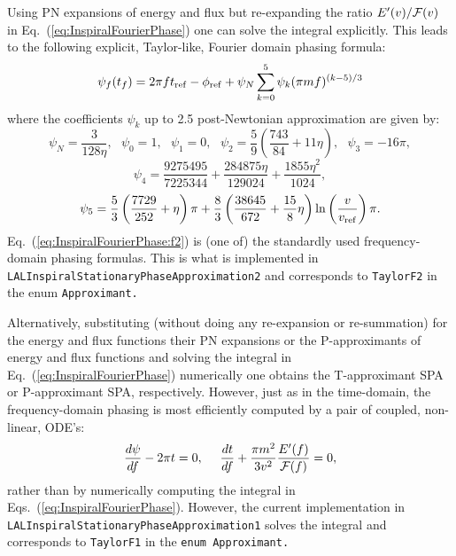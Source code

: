 Using PN expansions of energy and flux but
re-expanding the ratio $E'(v)/{\cal F}(v)$ in Eq.~(\ref{eq:InspiralFourierPhase}) one
can solve the integral explicitly. This leads to the following
explicit, Taylor-like, Fourier domain phasing formula:
\begin{equation}
 \psi_f(t_f) = 2 \pi f t_{\rm ref} - \phi_{\rm ref} + 
 \psi_N \sum_{k=0}^5 {\psi}_k (\pi m f)^{(k-5)/3} 
\label{eq:InspiralFourierPhase:f2}
\end{equation}
where the coefficients ${\psi}_k$ up to 2.5 post-Newtonian approximation are given by:
$$\psi_N =  \frac{3}{128\eta},\ \ \ \psi_0 = 1,\ \ \ \psi_1 = 0,\ \ \   
\psi_2 =  \frac{5}{9} \left ( \frac{743}{84} + 11\eta\right ),\ \ \ 
\psi_3 =  -16\pi,$$
$$\psi_4 =  \frac{9275495}{7225344}+\frac{284875\eta}{129024 } + \frac{1855\eta^2}{1024},$$
$$\psi_5 =  \frac{5}{3} \left ( \frac{7729}{252} + \eta \right ) \pi +
   \frac{8}{3} \left ( \frac{38645}{672} + \frac{15}{8} \eta \right ) 
	\ln \left ( \frac{v}{v_{\rm ref}} \right )\pi.$$
Eq.~(\ref{eq:InspiralFourierPhase:f2}) is (one of) the  standardly used frequency-domain phasing formulas.
This is what is implemented in {\tt LALInspiralStationaryPhaseApproximation2}
and corresponds to \texttt{TaylorF2} in the enum \texttt{Approximant.}

Alternatively, substituting (without doing any re-expansion or re-summation) 
for the energy and flux functions their PN expansions
or the P-approximants of energy and flux functions 
and solving the integral in Eq.~(\ref{eq:InspiralFourierPhase}) numerically
one obtains the T-approximant SPA or P-approximant SPA, respectively.
However, just as in the time-domain, the frequency-domain phasing is 
most efficiently computed by a pair of coupled, non-linear, ODE's:
\begin{equation}
\frac{d\psi}{df} - 2\pi t = 0, \ \ \ \
\frac{dt}{df} + \frac{\pi m^2}{3v^2} \frac{E'(f)}{{\cal F}(f)} = 0,
\label {eq:frequencyDomainODE}
\end{equation}
rather  than by numerically computing the integral in  
Eqs.~(\ref{eq:InspiralFourierPhase}).  However, the current implementation 
in {\tt LALInspiralStationaryPhaseApproximation1} solves the integral 
and corresponds to \texttt{TaylorF1} in the  \texttt{enum Approximant.}


